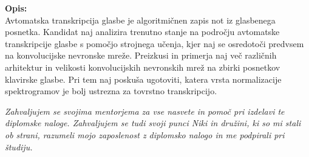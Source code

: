 \documentclass[a4paper, 12pt, openright]{book}
\newcommand{\clearemptydoublepage}{\newpage{\pagestyle{empty}\cleardoublepage}}
\begin{document}
\bigskip
\noindent\textbf{Opis:}\\
Avtomatska transkripcija glasbe je algoritmičnen zapis not iz glasbenega posnetka.
Kandidat naj analizira trenutno stanje na področju avtomatske transkripcije glasbe s pomočjo strojnega učenja, kjer naj se osredotoči predvsem na konvolucijske nevronske mreže.
Preizkusi in primerja naj več različnih arhitektur in velikosti konvolucijskih nevronskih mrež na zbirki posnetkov klavirske glasbe.
Pri tem naj poskuša ugotoviti, katera vrsta normalizacije spektrogramov je bolj ustrezna za tovrstno transkripcijo.



\vfill



\vspace{2cm}

\clearemptydoublepage

\thispagestyle{empty}\mbox{}\vfill\null\it%
\noindent
Zahvaljujem se svojima mentorjema za vse nasvete in pomoč pri izdelavi te diplomske naloge.
Zahvaljujem se tudi svoji punci Niki in družini, ki so mi stali ob strani, razumeli mojo zaposlenost z diplomsko nalogo in me podpirali pri študiju.
\rm\normalfont

\clearemptydoublepage




\pagestyle{empty}
\def\thepage{}%
\tableofcontents{}




\end{document}

